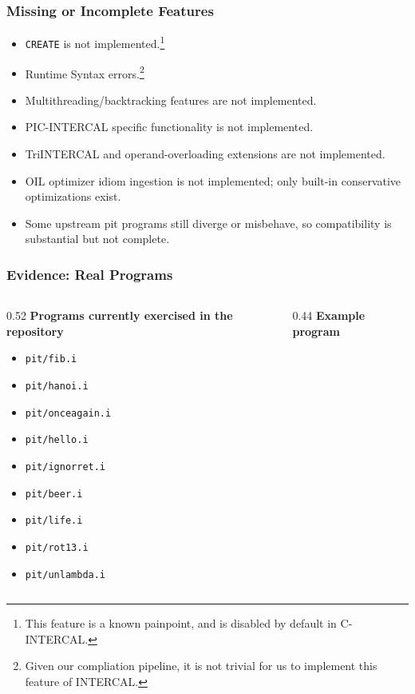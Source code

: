 \documentclass{beamer}
\begin{document}
\begin{frame}
  \frametitle{Missing or Incomplete Features}

  \vfill
  \begin{itemize}
    \item \texttt{CREATE} is not implemented.\footnote{This feature is a known painpoint, and is disabled by default in C-INTERCAL.}
    \item Runtime Syntax errors.\footnote{Given our compliation pipeline, it is not trivial for us to implement this feature of INTERCAL.}
    \item Multithreading/backtracking features are not implemented.
    \item PIC-INTERCAL specific functionality is not implemented.
    \item TriINTERCAL and operand-overloading extensions are not implemented.
    \item OIL optimizer idiom ingestion is not implemented; only built-in conservative optimizations exist.
    \item Some upstream pit programs still diverge or misbehave, so compatibility is substantial but not complete.
  \end{itemize}
  \vfill
\end{frame}

\begin{frame}[fragile]
  \frametitle{Evidence: Real Programs}

  \begin{columns}[T]
    \begin{column}{0.52\textwidth}
      \textbf{Programs currently exercised in the repository}
      \begin{itemize}
        \item \texttt{pit/fib.i}
        \item \texttt{pit/hanoi.i}
        \item \texttt{pit/onceagain.i}
        \item \texttt{pit/hello.i}
        \item \texttt{pit/ignorret.i}
        \item \texttt{pit/beer.i}
        \item \texttt{pit/life.i}
        \item \texttt{pit/rot13.i}
        \item \texttt{pit/unlambda.i}
      \end{itemize}
    \end{column}
    \begin{column}{0.44\textwidth}
      \textbf{Example program}
      
    \end{column}
  \end{columns}
\end{frame}
\end{document}
